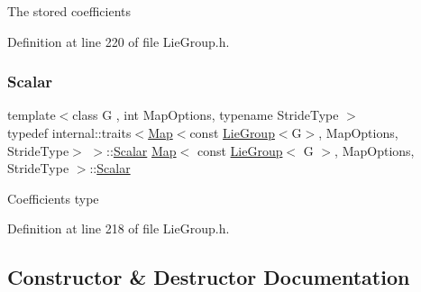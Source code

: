 The stored coefficients 

Definition at line 220 of file Lie\+Group.\+h.

\hypertarget{class_map_3_01const_01_lie_group_3_01_g_01_4_00_01_map_options_00_01_stride_type_01_4_a006635f5fe4155200809ee347f61b9a6}{}\label{class_map_3_01const_01_lie_group_3_01_g_01_4_00_01_map_options_00_01_stride_type_01_4_a006635f5fe4155200809ee347f61b9a6} 
\subsubsection{\texorpdfstring{Scalar}{Scalar}}
{\footnotesize\ttfamily template$<$class G , int Map\+Options, typename Stride\+Type $>$ \\
typedef internal\+::traits$<$\hyperlink{class_map_3_01const_01_lie_group_3_01_g_01_4_00_01_map_options_00_01_stride_type_01_4_a95174b5f6c93ceefa0fbc6ef6fdf65f7}{Map}$<$const \hyperlink{class_lie_group}{Lie\+Group}$<$G$>$, Map\+Options, Stride\+Type$>$ $>$\+::\hyperlink{class_map_3_01const_01_lie_group_3_01_g_01_4_00_01_map_options_00_01_stride_type_01_4_a006635f5fe4155200809ee347f61b9a6}{Scalar} \hyperlink{class_map_3_01const_01_lie_group_3_01_g_01_4_00_01_map_options_00_01_stride_type_01_4_a95174b5f6c93ceefa0fbc6ef6fdf65f7}{Map}$<$ const \hyperlink{class_lie_group}{Lie\+Group}$<$ G $>$, Map\+Options, Stride\+Type $>$\+::\hyperlink{class_map_3_01const_01_lie_group_3_01_g_01_4_00_01_map_options_00_01_stride_type_01_4_a006635f5fe4155200809ee347f61b9a6}{Scalar}}

Coefficients type 

Definition at line 218 of file Lie\+Group.\+h.



\subsection{Constructor \& Destructor Documentation}
\hypertarget{class_map_3_01const_01_lie_group_3_01_g_01_4_00_01_map_options_00_01_stride_type_01_4_a95174b5f6c93ceefa0fbc6ef6fdf65f7}{}\label{class_map_3_01const_01_lie_group_3_01_g_01_4_00_01_map_options_00_01_stride_type_01_4_a95174b5f6c93ceefa0fbc6ef6fdf65f7} 
